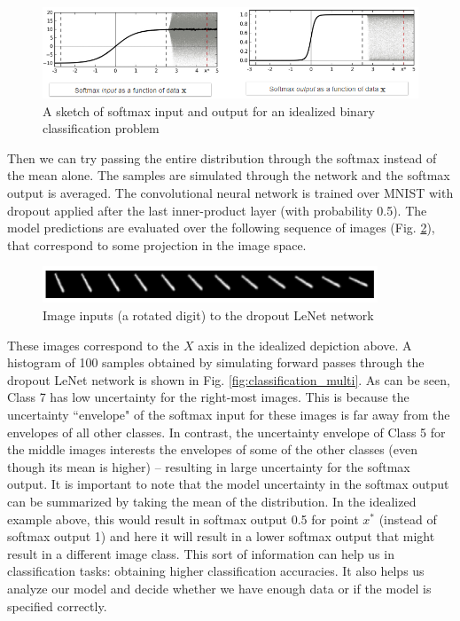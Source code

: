 \begin{figure}[H]
    \centering
    \includegraphics[width=\textwidth]{labs/12/images/Classification_binary.png}
    \caption{A sketch of softmax input and output for an idealized binary classification problem}
    \label{fig:classification_binary}
\end{figure}

Then we can try passing the entire distribution through the softmax instead of the mean alone. The samples are simulated through the network and the softmax output is averaged. The convolutional neural network is trained over MNIST with dropout applied after the last inner-product layer (with probability 0.5). The model predictions are evaluated over the following sequence of images (Fig. \ref{fig:classification_input}), that correspond to some projection in the image space.

\begin{figure}[H]
    \centering
    \includegraphics[width=10cm]{labs/12/images/Classification_input.png}
    \caption{Image inputs (a rotated digit) to the dropout LeNet network}
    \label{fig:classification_input}
\end{figure}

These images correspond to the $X$ axis in the idealized depiction above. A histogram of 100 samples obtained by simulating forward passes through the dropout LeNet network is shown in Fig. \ref{fig:classification_multi}. As can be seen, Class 7 has low uncertainty for the right-most images. This is because the uncertainty ``envelope" of the softmax input for these images is far away from the envelopes of all other classes. In contrast, the uncertainty envelope of Class 5 for the middle images interests the envelopes of some of the other classes (even though its mean is higher) -- resulting in large uncertainty for the softmax output. It is important to note that the model uncertainty in the softmax output can be summarized by taking the mean of the distribution. In the idealized example above, this would result in softmax output 0.5 for point $x^*$ (instead of softmax output 1) and here it will result in a lower softmax output that might result in a different image class. This sort of information can help us in classification tasks: obtaining higher classification accuracies. It also helps us analyze our model and decide whether we have enough data or if the model is specified correctly.

